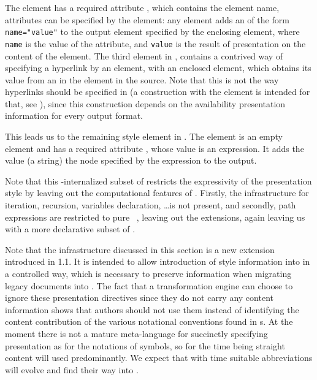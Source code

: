 The {} element has a required attribute
{}, which contains the element name, attributes can be
specified by the {} element: any {} element
adds an {} of the form {\tt{name="value"}} to the
output element specified by the enclosing {} element, where
{\tt{name}} is the value of the {} attribute, and
{\tt{value}} is the result of presentation on the content of the
{} element. The third {} element in
{}, contains a contrived way of specifying a {\html} hyperlink by
an {} element, with an enclosed {} element,
which obtains its value from an {} in the {} element
in the {\omdoc} source. Note that this is not the way hyperlinks should be
specified in {\omdoc} (a construction with the {} element is
intended for that, see {}), since this construction depends on the
availability presentation information for every output format.  

This leads us to the remaining style element in {\omdoc}. The {}
element is an empty element and has a required attribute
{}, whose value is an {\xpath} expression. It adds
the value (a string) the {\xml} node specified by the expression to the output.

Note that this {\omdoc}-internalized subset of {\xslt} restricts the expressivity
of the presentation style by leaving out the computational features of {\xslt}.
Firstly, the infrastructure for iteration, recursion, variables declaration,
\ldots is not present, and secondly, path expressions are restricted to pure
{\xpath}~\cite{ClaDeR:xpath99}, leaving out the {\xslt} extensions, again leaving
us with a more declarative subset of {\xslt}.

Note that the infrastructure discussed in this section is a new extension
introduced in {\omdoc}1.1. It is intended to allow introduction of style
information into {\omdoc} in a controlled way, which is necessary to preserve
information when migrating legacy documents into {\omdoc}. The fact that a
transformation engine can choose to ignore these presentation directives since
they do not carry any content information shows that authors should not use them
instead of identifying the content contribution of the various notational
conventions found in {s}. At the
moment there is not a mature meta-language for succinctly specifying presentation
as for the notations of symbols, so for the time being straight {\xslt} content
will used predominantly. We expect that with time suitable abbreviations will
evolve and find their way into {\omdoc}.

